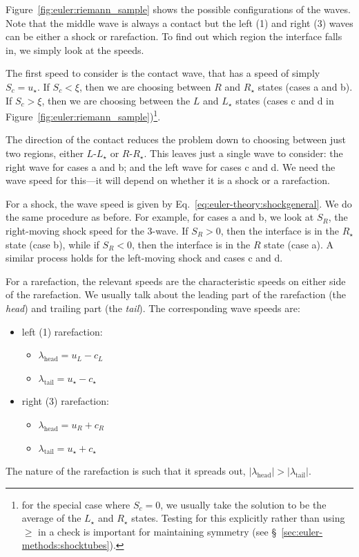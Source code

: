 Figure~\ref{fig:euler:riemann_sample} shows the possible
configurations of the waves.  Note that the middle wave is always a
contact but the left (1) and right (3) waves can be either a shock or
rarefaction.  To find out which region the interface falls in, we simply
look at the speeds.  

The first speed to consider is the contact wave, that has a speed of
simply $S_c = u_\star$.  If $S_c < \xi$, then we are choosing between
$R$ and $R_\star$ states (cases a and b).  If $S_c > \xi$, then we are
choosing between the $L$ and $L_\star$ states (cases c and d in
Figure~\ref{fig:euler:riemann_sample})\footnote{for the special case
  where $S_c = 0$, we usually take the solution to be the average of
  the $L_\star$ and $R_\star$ states.  Testing for this explicitly
  rather than using $\ge$ in a check is important for maintaining
  symmetry (see \S~\ref{sec:euler-methods:shocktubes}).}.

The direction of the contact reduces the problem down to choosing
between just two regions, either $L$-$L_\star$ or $R$-$R_\star$.  This
leaves just a single wave to consider: the right wave for cases a and
b; and the left wave for cases c and d.  We need the wave speed for
this---it will depend on whether it is a shock or a rarefaction.  

For a shock, the wave speed is given by
Eq.~\ref{eq:euler-theory:shockgeneral}.  We do the same procedure as
before.  For example, for cases a and b, we look at $S_R$, the
right-moving shock speed for the 3-wave.  If $S_R > 0$, then the
interface is in the $R_\star$ state (case b), while if $S_R < 0$, then
the interface is in the $R$ state (case a).  A similar process
holds for the left-moving shock and cases c and d.

For a rarefaction, the
relevant speeds are the characteristic speeds on either side of the
rarefaction.  We usually talk about the leading part of the
rarefaction (the {\em head}) and trailing part (the {\em tail}).  The
corresponding wave speeds are:
\begin{itemize}
\item left (1) rarefaction:
  \begin{itemize} 
  \item $\lambda_\mathrm{head} = u_L - c_L$
  \item $\lambda_\mathrm{tail} = u_\star - c_\star$
  \end{itemize}
  
\item right (3) rarefaction:
  \begin{itemize} 
  \item $\lambda_\mathrm{head} = u_R + c_R$
  \item $\lambda_\mathrm{tail} = u_\star + c_\star$
  \end{itemize}
\end{itemize}
The nature of the rarefaction is such that it spreads out,
$|\lambda_\mathrm{head}| > |\lambda_\mathrm{tail}|$.


